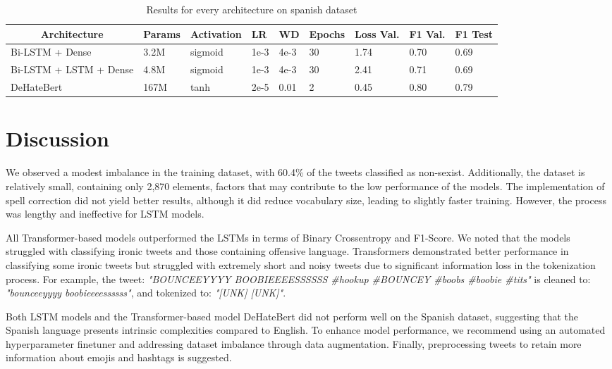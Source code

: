 \documentclass[11pt]{article}
\begin{document}
\begin{table*}[!t]
\begin{tabular}{l|l|l|l|l|l|l|l|l}
\multicolumn{1}{c|}{\textbf{Architecture}} & \textbf{Params} & \textbf{Activation} & \textbf{LR} & \textbf{WD} & \textbf{Epochs} & \textbf{Loss Val.} & \textbf{F1 Val.} & \multicolumn{1}{c}{\textbf{F1 Test}} \\ \hline

Bi-LSTM + Dense		& 	3.2M	& sigmoid		& 1e-3	& 4e-3 	& 30 & 1.74 &	0.70 & 0.69\\
Bi-LSTM + LSTM + Dense	& 		4.8M	& sigmoid		& 1e-3	& 4e-3	& 30 & 2.41 & 0.71 & 0.69\\
DeHateBert	&   167M	& tanh	& 2e-5	& 0.01	& 	2 & 0.45 &  0.80 & 0.79

\end{tabular}
\caption{Results for every architecture on spanish dataset}
\end{table*}




\section{Discussion}
\label{sec:discussion}
We observed a modest imbalance in the training dataset, with 60.4\% of the tweets classified as non-sexist. Additionally, the dataset is relatively small, containing only 2,870 elements, factors that may contribute to the low performance of the models. The implementation of spell correction did not yield better results, although it did reduce vocabulary size, leading to slightly faster training. However, the process was lengthy and ineffective for LSTM models.

All Transformer-based models outperformed the LSTMs in terms of Binary Crossentropy and F1-Score. We noted that the models struggled with classifying ironic tweets and those containing offensive language. Transformers demonstrated better performance in classifying some ironic tweets but struggled with extremely short and noisy tweets due to significant information loss in the tokenization process. For example, the tweet: \textit{"BOUNCEEYYYY BOOBIEEEESSSSSS \#hookup \#BOUNCEY \#boobs \#boobie \#tits"} is cleaned to: \textit{"bounceeyyyy boobieeeessssss"}, and tokenized to: \textit{"[UNK] [UNK]"}.

Both LSTM models and the Transformer-based model DeHateBert did not perform well on the Spanish dataset, suggesting that the Spanish language presents intrinsic complexities compared to English. To enhance model performance, we recommend using an automated hyperparameter finetuner and addressing dataset imbalance through data augmentation. Finally, preprocessing tweets to retain more information about emojis and hashtags is suggested.
\end{document}

